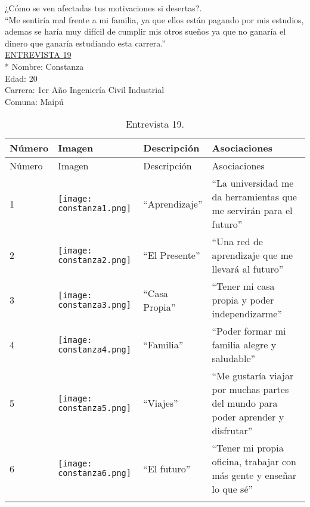 ¿Cómo se ven afectadas tus motivaciones si desertas?.\\

``Me sentiría mal frente a mi familia, ya que ellos están pagando por mis estudios, ademas se haría muy difícil de cumplir mis otros sueños ya que no ganaría el dinero que ganaría estudiando esta carrera.''\\


\underline {ENTREVISTA 19}\\*
Nombre: Constanza\\
Edad: 20\\
Carrera: 1er Año Ingeniería Civil Industrial\\
Comuna: Maipú\\

\begin{longtable}{>{\centering\arraybackslash}m{1cm} >{\centering\arraybackslash}m{2cm} >{\arraybackslash}m{5cm}>{\arraybackslash}m{5cm}}
	
	\hline
	Número & Imagen & Descripción & Asociaciones \\
	\hline \hline
	\endfirsthead
	
	\hline
	Número & Imagen & Descripción & Asociaciones \\
	\hline \hline
	\endhead
		
		1 & \texttt{[image: constanza1.png]} & ``Aprendizaje'' & ``La universidad me da herramientas que me servirán para el futuro'' \\
		\hline
		
		2 & \texttt{[image: constanza2.png]} & ``El Presente'' & ``Una red de aprendizaje que me llevará al futuro'' \\
		\hline
		
		3 & \texttt{[image: constanza3.png]} & ``Casa Propia'' & ``Tener mi casa propia y poder independizarme'' \\
		\hline
		
		4 & \texttt{[image: constanza4.png]} & ``Familia'' & ``Poder formar mi familia alegre y saludable'' \\
		\hline
		
		5 & \texttt{[image: constanza5.png]} & ``Viajes'' & ``Me gustaría viajar por muchas partes del mundo para poder aprender y disfrutar'' \\
		\hline
		
		6 & \texttt{[image: constanza6.png]} & ``El futuro'' & ``Tener mi propia oficina, trabajar con más gente y enseñar lo que sé'' \\
		\hline

	\caption{Entrevista 19.}
	\label{tabla:contanza}
\end{longtable}

